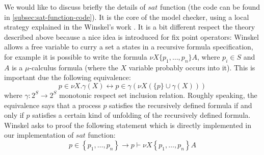 We would like to discuss briefly the details of $sat$ function (the
code can be found in \autoref{subsec:sat-function-code}). It is the
core of the model checker, using a local strategy explained in the
Winskel's work \cite{Winskel1991157}. It is a bit different respect
the theory described above because a nice idea is introduced for fix
point operators: Winskel allows a free variable to curry a set a
states in a recursive formula specification, for example it is
possible to write the formula $\nu X\{p_1,\ldots,p_n\} A$, where $p_i
\in S$ and $A$ is a $\mu$-calculus formula (where the $X$ variable
probably occurs into it). This is important due the following
equivalence:
\begin{displaymath}
  p \in \nu X.\gamma(X) \leftrightarrow p \in \gamma (\nu X(\{p\}\cup\gamma(X)))
\end{displaymath}
where $\gamma : 2^S \rightarrow 2^S$ monotonic respect set inclusion
relation. Roughly speaking, the equivalence says that a process $p$
satisfies the recursively defined formula if and only if $p$ satisfies
a certain kind of unfolding of the recursively defined
formula. Winskel asks to proof the following statement which is
directly implemented in our implementation of $sat$ function:
\begin{displaymath}
  p \in \left \lbrace p_1,\ldots,p_n\right\rbrace \rightarrow
  p \vdash \nu X \left \lbrace p_1,\ldots,p_n\right\rbrace A
\end{displaymath}


